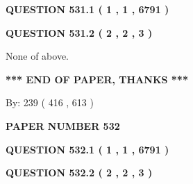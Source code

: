 \documentclass[12pt]{article}
\begin{document}
   
  
\vspace{0.2in}
  
{\textbf{\Large{QUESTION
531.1 
 ( 1 , 1 , 6791 )
}}}
  
  
  
\vspace{0.2in}
  
{\textbf{\Large{QUESTION
531.2 
 ( 2 , 2 , 3 )
}}}
  
  
 
 
\noindent{}
 
 
 None of above.
 
 
 
 
   
   
 \vspace{0.2in}
 
   
   
   
   
\vspace{1.0in} 
{\textbf{\large{ *** END OF PAPER, THANKS *** }}} 
   
   
\hspace{1.0in} By: 
 239 ( 416 ,  613 )
   
   
   
   
\newpage 
\setcounter{page}{ 
   532001 } 
   
   
   
   
 {\textbf{ \Large{ PAPER NUMBER  532  }}}
   
   
\vspace{0.2in}
   
   
   
   
   
   
 \vspace{0.2in}
 
 
 
 
   
   
  
\vspace{0.2in}
  
{\textbf{\Large{QUESTION
532.1 
 ( 1 , 1 , 6791 )
}}}
  
  
  
\vspace{0.2in}
  
{\textbf{\Large{QUESTION
532.2 
 ( 2 , 2 , 3 )
}}}
  
\end{document}
